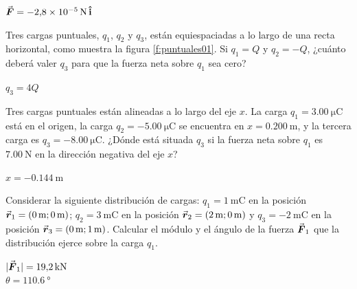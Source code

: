 \begin{Answer}
  $\va*{F} = \SI{-2.8E-5}{\newton}\,\vu{i}$
\end{Answer}
%
\begin{Exercise}\label{p:puntuales01}
  Tres cargas puntuales, $q_1$, $q_2$ y $q_3$, están equiespaciadas a lo largo de una recta horizontal, como muestra la figura \ref{f:puntuales01}. Si $q_1 = Q$ y $q_2 = -Q$, ¿cuánto deberá valer $q_3$ para que la fuerza neta sobre $q_1$ sea cero?
\end{Exercise}
\begin{Answer}
  $q_3 = 4Q$
\end{Answer}
%
\begin{center}
\end{center}
%
\begin{Exercise}
  Tres cargas puntuales están alineadas a lo largo del eje $x$. La carga $q_1 = \SI{3.00}{\micro\coulomb}$ está en el origen, la carga $q_2 = \SI{-5.00}{\micro\coulomb}$ se encuentra en $x = \SI{0.200}{\metre}$, y la tercera carga es $q_3 = \SI{-8.00}{\micro\coulomb}$. ¿Dónde está situada $q_3$ si la fuerza neta sobre $q_1$ es $\SI{7.00}{\newton}$ en la dirección negativa del eje $x$?
\end{Exercise}
\begin{Answer}
  $x = \SI{-0.144}{\metre}$
\end{Answer}
%
\begin{Exercise}
  Considerar la siguiente distribución de cargas: $q_1 = \SI{1}{\milli\coulomb}$ en la posición $\va*{r}_1 = (\SI{0}{\metre};\SI{0}{\metre})$; $q_2 = \SI{3}{\milli\coulomb}$ en la posición $\va*{r}_2 = (\SI{2}{\metre};\SI{0}{\metre})$ y $q_3 = \SI{-2}{\milli\coulomb}$ en la posición $\va*{r}_3 = (\SI{0}{\metre};\SI{1}{\metre})$. Calcular el módulo y el ángulo de la fuerza $\va*{F}_1$ que la distribución ejerce sobre la carga $q_1$.
\end{Exercise}
\begin{Answer}
  \begin{minipage}[t]{.5\textwidth}
    $|\va*{F}_1| = \SI{19.2}{\kilo\newton}$\\ $\theta = \SI{110.6}{\degree}$
  \end{minipage}
\end{Answer}
